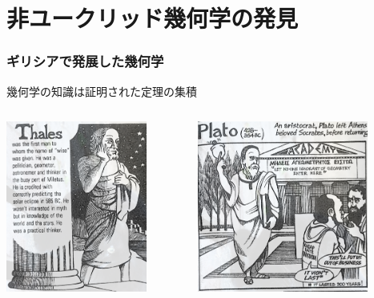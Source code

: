 \documentclass[unicode, 14pt, aspectratio=169]{beamer}
\begin{document}
\section{非ユークリッド幾何学の発見}
\begin{frame}
  \frametitle{ギリシアで発展した幾何学}
  {\large 幾何学の知識は証明された定理の集積}
\begin{columns}
  \begin{column}{0.25\textwidth}  %
    \begin{center}
      \includegraphics[width=0.8\textwidth]{images/thales.png}
    \end{center}
  \end{column}
  \begin{column}{0.25\textwidth}  %
    \begin{center}
      \includegraphics[width=0.8\textwidth]{images/plato.png}

\end{center}
\end{column}
\end{columns}
\end{frame}
\end{document}
